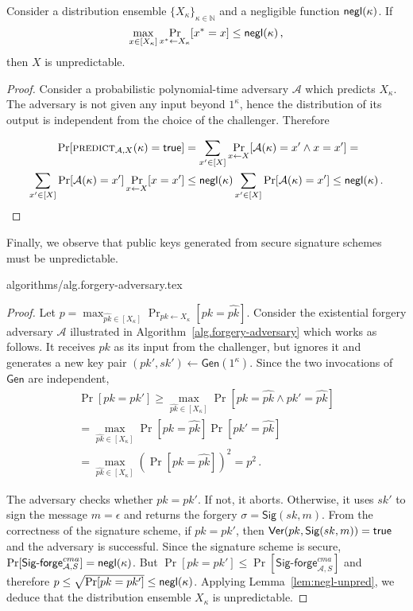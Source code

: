 \begin{lem}\label{lem:negl-unpred}
  Consider a distribution ensemble $\{X_{\kappa}\}_{\kappa\in\mathbb{N}}$ and
  a negligible function $\textsf{negl}(\kappa)$. If
  \[\max_{x \in [X_\kappa]}\Pr_{x^* \gets X_\kappa}[x^* = x] \leq \textsf{negl}(\kappa)\,,\]
  then $X$ is unpredictable.
\end{lem}
\begin{proof}
  Consider a probabilistic polynomial-time adversary $\mathcal{A}$ which
  predicts $X_\kappa$. The adversary is not given any input beyond $1^\kappa$,
  hence the distribution of its output is independent from the choice of the
  challenger. Therefore

  \begin{align*}
  \Pr[\textsc{predict}_{\mathcal{A},X}(\kappa) = \mathsf{true}] &=
  \sum_{x' \in [X]}\Pr_{x \gets X}[\mathcal{A}(\kappa) = x'\land x = x'] =\\
  \sum_{x' \in [X]}\Pr[\mathcal{A}(\kappa) = x']\Pr_{x \gets X}[x = x']
  &\leq \textsf{negl}(\kappa)\sum_{x' \in [X]}\Pr[\mathcal{A}(\kappa) = x']
  \leq \textsf{negl}(\kappa)
  \,.
  \end{align*}
\end{proof}

Finally, we observe that public keys generated from secure signature schemes must
be unpredictable.

{algorithms/alg.forgery-adversary.tex}

\restateLemPkUnpredictability*
\begin{proof}
  Let
  $p = \max_{\widehat{pk} \in [X_\kappa]}\Pr_{pk \gets X_\kappa}[pk = \widehat{pk}]$.
  Consider the existential forgery adversary $\mathcal{A}$ illustrated in
  Algorithm~\ref{alg.forgery-adversary} which works as
  follows. It receives $pk$ as its input from the challenger, but ignores it
  and generates a new key pair $(pk', sk') \gets \textsf{Gen}(1^\kappa)$.
  Since the
  two invocations of $\textsf{Gen}$ are independent,
  \begin{align*}
    \Pr[pk = pk'] \geq \max_{\widehat{pk} \in [X_\kappa]}\Pr[pk = \widehat{pk} \land pk' = \widehat{pk}]\\
  = \max_{\widehat{pk} \in [X_\kappa]}\Pr[pk = \widehat{pk}]\Pr[pk' = \widehat{pk}]\\
  = \max_{\widehat{pk} \in [X_\kappa]}\left(\Pr[pk = \widehat{pk}]\right)^2
  = p^2
  \,.
  \end{align*}

  The adversary checks
  whether $pk = pk'$. If not, it aborts. Otherwise, it uses $sk'$ to sign the
  message $m = \epsilon$ and returns the forgery $\sigma = \textsf{Sig}(sk, m)$.
  From the correctness of the signature scheme, if $pk = pk'$, then
  $\textsf{Ver}(pk, \textsf{Sig}(sk, m)) = \mathsf{true}$ and the adversary is
  successful. Since the signature scheme is secure,
  $\Pr[\textsf{Sig-forge}^{cma}_{\mathcal{A},S}] = \textsf{negl}(\kappa)$.
  But $\Pr[pk = pk'] \leq \Pr[\textsf{Sig-forge}^{cma}_{\mathcal{A},S}]$ and
  therefore $p \leq \sqrt{\Pr[pk = pk']} \leq \textsf{negl}(\kappa)$. Applying
  Lemma~\ref{lem:negl-unpred}, we deduce that the distribution ensemble $X_\kappa$ is
  unpredictable.
\end{proof}

